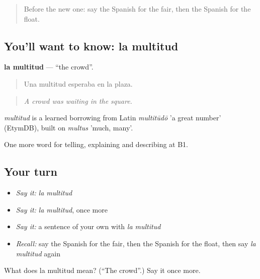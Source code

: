 \label{lesson:ES-C559-multitud}



\begin{quote}
Before the new one: say the Spanish for the fair, then the Spanish for the float.
\end{quote}

\subsection*{You'll want to know: la multitud}
\textbf{la multitud} — \textquotedblleft{}the crowd\textquotedblright{}.

\begin{quote}
Una multitud esperaba en la plaza.
\end{quote}

\begin{quote}
\emph{A crowd was waiting in the square.}
\end{quote}

\begin{cousinweb}
\emph{multitud} is a learned borrowing from Latin \emph{multitūdō} 'a great number' (EtymDB), built on \emph{multus} 'much, many'.
\end{cousinweb}

\begin{grammarlens}[title={What you've built}]
One more word for telling, explaining and describing at B1.
\end{grammarlens}

\subsection*{Your turn}
\begin{itemize}
\raggedright
  \item \emph{Say it:} \emph{la multitud}
  \item \emph{Say it:} \emph{la multitud}, once more
  \item \emph{Say it:} a sentence of your own with \emph{la multitud}
  \item \emph{Recall:} say the Spanish for the fair, then the Spanish for the float, then say \emph{la multitud} again
\end{itemize}

\begin{tcolorbox}[breakable,colback=teal!4,colframe=teal!35!black,title={Before you move on}]
What does la multitud mean? (\textquotedblleft{}The crowd\textquotedblright{}.) Say it once more.
\end{tcolorbox}
